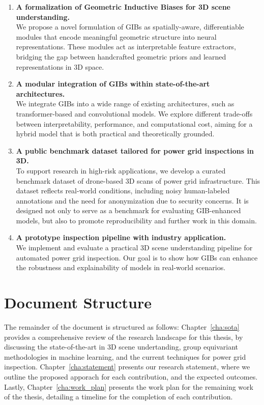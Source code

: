 \begin{enumerate}
      \item \textbf{A formalization of Geometric Inductive Biases
                  for 3D scene understanding.} \\
            We propose a novel formulation of GIBs as spatially-aware,
            differentiable modules that encode meaningful geometric structure
            into neural representations.
            These modules act as interpretable feature extractors,
            bridging the gap between handcrafted geometric priors and
            learned representations in 3D space.

      \item \textbf{A modular integration of GIBs within state-of-the-art architectures.} \\
            We integrate GIBs into a wide range of existing architectures,
            such as transformer-based and convolutional models.
            We explore different trade-offs
            between interpretability, performance, and computational cost,
            aiming for a hybrid model that is both practical
            and theoretically grounded.

      \item \textbf{A public benchmark dataset tailored for power grid inspections in 3D.} \\
            To support research in high-risk applications,
            we develop a curated benchmark dataset of drone-based 3D scans of
            power grid infrastructure. This dataset reflects real-world conditions,
            including noisy human-labeled annotations and the need for
            anonymization due to security concerns.
            It is designed not only to serve as a benchmark for evaluating
            GIB-enhanced models, but also to promote reproducibility and
            further work in this domain.

      \item \textbf{A prototype inspection pipeline with industry application.} \\
            We implement and evaluate a practical 3D scene understanding
            pipeline for automated power grid inspection.
            Our goal is to show how GIBs can enhance the robustness and explainability
            of models in real-world scenarios.
\end{enumerate}

\section{Document Structure}

The remainder of the document is structured as follows:
%
Chapter~\ref{cha:sota} provides a comprehensive review of the research
landscape for this thesis, by discussing the state-of-the-art in 3D scene
undertanding, group equivariant methodologies in machine learning, and the
current techniques for power grid inspection.
%
Chapter~\ref{cha:statement} presents our research statement, where we outline
the proposed apporach for each contribution, and the expected outcomes.
%
Lastly, Chapter~\ref{cha:work_plan} presents the work plan for the remaining
work of the thesis, detailing a timeline for the completion of each
contribution.
